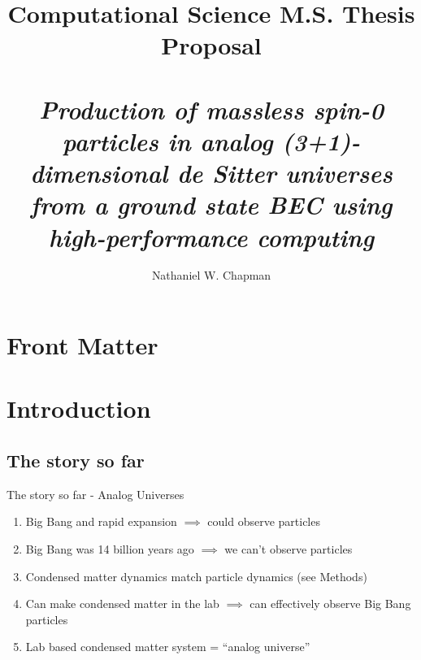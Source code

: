 \documentclass[aspectratio=169]{beamer}
\title[]{Computational Science M.S. Thesis Proposal \\ \quad \vspace{-0.25in}\\ \emph{Production of massless spin-0 particles in analog (3+1)-dimensional de Sitter universes from a ground state BEC using high-performance computing}}
\institute[]{Central Washington University}
\author{Nathaniel W. Chapman}
\begin{document}
    \section*{Front Matter}
        {
        \frame{\titlepage}
        }

        
\section{Introduction}

    \subsection{The story so far}
    
        \begin{frame}{The story so far - Analog Universes}
            \begin{enumerate}
                \item Big Bang and rapid expansion $\implies$ could observe particles
                \item Big Bang was 14 billion years ago $\implies$ we can't observe particles
                \item Condensed matter dynamics match particle dynamics (see Methods)
                \item Can make condensed matter in the lab $\implies$ can effectively observe Big Bang particles
                \item Lab based condensed matter system = ``analog universe''
            \end{enumerate}
        \end{frame}
\end{document}
